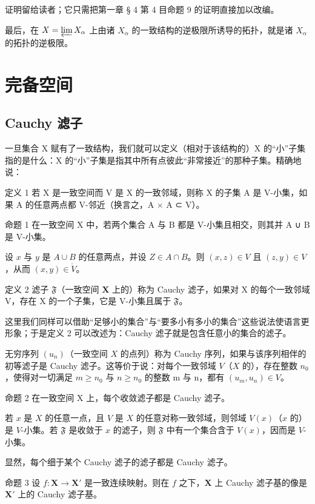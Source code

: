 证明留给读者；它只需把第一章 § 4 第 4 目命题 9 的证明直接加以改编。

最后，在 \(X = \varprojlim X_{\alpha}\) 上由诸 \(X_{\alpha}\) 的一致结构的逆极限所诱导的拓扑，就是诸 \(X_{\alpha}\) 的拓扑的逆极限。

\section{完备空间}

\subsection{Cauchy 滤子}

一旦集合 X 赋有了一致结构，我们就可以定义（相对于该结构的）X 的“小”子集指的是什么：X 的“小”子集是指其中所有点彼此“非常接近”的那种子集。精确地说：

定义 1 若 X 是一致空间而 V 是 X 的一致邻域，则称 X 的子集 A 是 V-小集，如果 A 的任意两点都 V-邻近（换言之，A × A ⊂ V）。

命题 1 在一致空间 X 中，若两个集合 A 与 B 都是 V-小集且相交，则其并 A ∪ B 是 V-小集。

设 \(x\) 与 \(y\) 是 \(A \cup B\) 的任意两点，并设 \(Z \in A \cap B\)。则 \((x, z) \in V\) 且 \((z, y) \in V\)，从而 \((x, y) \in \mathring{V}\)。

定义 2 滤子 \(\mathfrak{F}\)（一致空间 \(\mathbf{X}\) 上的）称为 Cauchy 滤子，如果对 X 的每个一致邻域 V，存在 X 的一个子集，它是 V-小集且属于 \(\mathfrak{F}\)。

这里我们同样可以借助“足够小的集合”与“要多小有多小的集合”这些说法使语言更形象；于是定义 2 可以改述为：Cauchy 滤子就是包含任意小的集合的滤子。

无穷序列 \((u_n)\)（一致空间 \(X\) 的点列）称为 Cauchy 序列，如果与该序列相伴的初等滤子是 Cauchy 滤子。这等价于说：对每个一致邻域 \(V\)（\(X\) 的），存在整数 \(n_0\)，使得对一切满足 \(m \geqslant n_0\) 与 \(n \geqslant n_0\) 的整数 m 与 n，都有 \((u_m, u_n) \in V\)。

命题 2 在一致空间 X 上，每个收敛滤子都是 Cauchy 滤子。

若 \(x\) 是 \(X\) 的任意一点，且 \(V\) 是 \(X\) 的任意对称一致邻域，则邻域 \(V(x)\)（\(x\) 的）是 \(V\)-小集。若 \(\mathfrak{F}\) 是收敛于 \(x\) 的滤子，则 \(\mathfrak{F}\) 中有一个集合含于 \(V(x)\)，因而是 \(V\)-小集。

显然，每个细于某个 Cauchy 滤子的滤子都是 Cauchy 滤子。

命题 3 设 \(f: \mathbf{X} \to \mathbf{X}'\) 是一致连续映射。则在 \(f\) 之下，\(\mathbf{X}\) 上 Cauchy 滤子基的像是 \(\mathbf{X}'\) 上的 Cauchy 滤子基。

